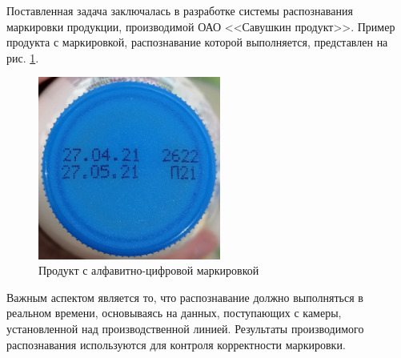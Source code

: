 Поставленная задача заключалась в разработке системы распознавания маркировки продукции, производимой ОАО <<Савушкин продукт>>. Пример продукта с маркировкой, распознавание которой выполняется, представлен на рис. \ref{fig:digital_code}.

\begin{figure}[ht]
	\centering
	\includegraphics[width=6cm]{man-source/images/ch4/pic4-1.jpg}
	\caption{Продукт с алфавитно-цифровой маркировкой}
	\label{fig:digital_code}
\end{figure}

Важным аспектом является то, что распознавание должно выполняться в реальном времени, основываясь на данных, поступающих с камеры, установленной над производственной линией. Результаты производимого распознавания используются для контроля корректности маркировки.





